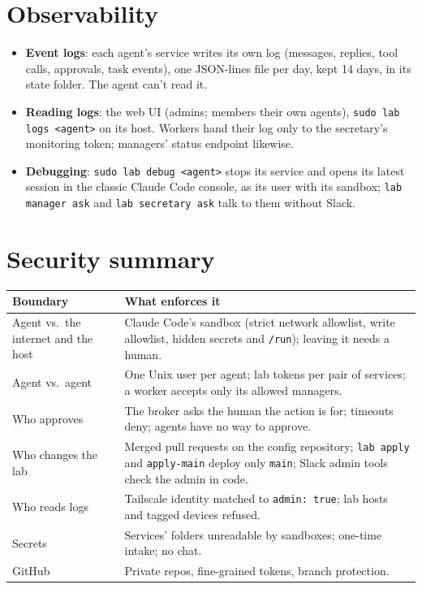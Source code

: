 \documentclass[11pt]{article}
\newcommand{\code}[1]{\texttt{#1}}
\begin{document}
\section{Observability}
\begin{itemize}
  \item \textbf{Event logs}: each agent's service writes its own log (messages, replies,
    tool calls, approvals, task events), one JSON-lines file per day, kept 14 days, in its
    state folder. The agent can't read it.
  \item \textbf{Reading logs}: the web UI (admins; members their own agents), \code{sudo lab logs <agent>} on its
    host. Workers hand their log only to the secretary's monitoring token; managers'
    status endpoint likewise.
  \item \textbf{Debugging}: \code{sudo lab debug <agent>} stops its service and opens its
    latest session in the classic Claude Code console, as its user with its sandbox;
    \code{lab manager ask} and \code{lab secretary ask} talk to them without Slack.
\end{itemize}

\section{Security summary}

\begin{tabularx}{\linewidth}{lL}
\toprule
Boundary & What enforces it \\
\midrule
Agent vs.\ the internet and the host & Claude Code's sandbox (strict network allowlist,
  write allowlist, hidden secrets and \code{/run}); leaving it needs a human. \\
Agent vs.\ agent & One Unix user per agent; lab tokens per pair of services; a worker
  accepts only its allowed managers. \\
Who approves & The broker asks the human the action is for; timeouts deny; agents have no
  way to approve. \\
Who changes the lab & Merged pull requests on the config repository; \code{lab apply} and
  \code{apply-main} deploy only \code{main}; Slack admin tools check the admin in code. \\
Who reads logs & Tailscale identity matched to \code{admin: true}; lab hosts and tagged
  devices refused. \\
Secrets & Services' folders unreadable by sandboxes; one-time intake; no chat. \\
GitHub & Private repos, fine-grained tokens, branch protection. \\
\bottomrule
\end{tabularx}
\end{document}
